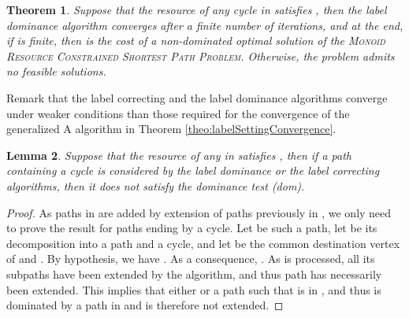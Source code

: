 \documentclass[11pt]{amsart}
\theoremstyle{plain}
\newtheorem{theo}{Theorem}
\newtheorem{lem}[theo]{Lemma}
\theoremstyle{remark}
\newcommand{\MRCSP}{\textsc{Monoid Resource Constrained Shortest Path Problem}\xspace}
\begin{document}
\begin{theo}\label{theo:labelDominanceConvergence}
Suppose that the resource of any cycle  in  satisfies , then the label dominance algorithm converges after a finite number of iterations, and at the end, if   is finite, then   is the cost of a non-dominated optimal solution of the \MRCSP. Otherwise, the problem admits no feasible solutions.
\end{theo}

Remark that the label correcting and the label dominance algorithms converge under weaker conditions than those required for the convergence of the generalized A algorithm in Theorem \ref{theo:labelSettingConvergence}. 

\begin{lem}\label{lem:labelCorrectingConv}
Suppose that the resource of any  in  satisfies , then if a path  containing a cycle is considered by the label dominance or the label correcting algorithms, then it does not satisfy the dominance test (dom).
\end{lem}


\begin{proof}
As paths in  are added by extension of paths previously in , we only need to prove the result for paths ending by a cycle. Let  be such a path, let  be its decomposition into a path and a cycle, and let  be the common destination vertex of  and . By hypothesis, we have . As a consequence, . As  is processed, all its subpaths have been extended by the algorithm, and thus path  has necessarily been extended. This implies that either  or a path  such that  is in , and thus  is dominated by a path in  and is therefore not extended.
\end{proof}
\end{document}
